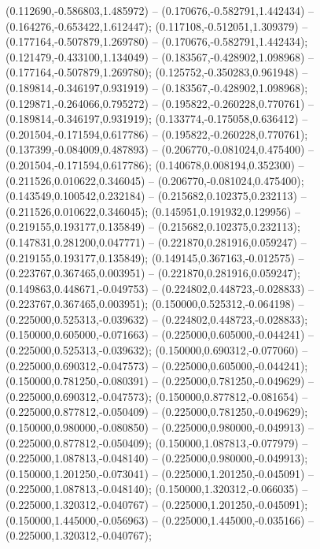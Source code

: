  (0.112690,-0.586803,1.485972) -- (0.170676,-0.582791,1.442434) -- (0.164276,-0.653422,1.612447);
 (0.117108,-0.512051,1.309379) -- (0.177164,-0.507879,1.269780) -- (0.170676,-0.582791,1.442434);
 (0.121479,-0.433100,1.134049) -- (0.183567,-0.428902,1.098968) -- (0.177164,-0.507879,1.269780);
 (0.125752,-0.350283,0.961948) -- (0.189814,-0.346197,0.931919) -- (0.183567,-0.428902,1.098968);
 (0.129871,-0.264066,0.795272) -- (0.195822,-0.260228,0.770761) -- (0.189814,-0.346197,0.931919);
 (0.133774,-0.175058,0.636412) -- (0.201504,-0.171594,0.617786) -- (0.195822,-0.260228,0.770761);
 (0.137399,-0.084009,0.487893) -- (0.206770,-0.081024,0.475400) -- (0.201504,-0.171594,0.617786);
 (0.140678,0.008194,0.352300) -- (0.211526,0.010622,0.346045) -- (0.206770,-0.081024,0.475400);
 (0.143549,0.100542,0.232184) -- (0.215682,0.102375,0.232113) -- (0.211526,0.010622,0.346045);
 (0.145951,0.191932,0.129956) -- (0.219155,0.193177,0.135849) -- (0.215682,0.102375,0.232113);
 (0.147831,0.281200,0.047771) -- (0.221870,0.281916,0.059247) -- (0.219155,0.193177,0.135849);
 (0.149145,0.367163,-0.012575) -- (0.223767,0.367465,0.003951) -- (0.221870,0.281916,0.059247);
 (0.149863,0.448671,-0.049753) -- (0.224802,0.448723,-0.028833) -- (0.223767,0.367465,0.003951);
 (0.150000,0.525312,-0.064198) -- (0.225000,0.525313,-0.039632) -- (0.224802,0.448723,-0.028833);
 (0.150000,0.605000,-0.071663) -- (0.225000,0.605000,-0.044241) -- (0.225000,0.525313,-0.039632);
 (0.150000,0.690312,-0.077060) -- (0.225000,0.690312,-0.047573) -- (0.225000,0.605000,-0.044241);
 (0.150000,0.781250,-0.080391) -- (0.225000,0.781250,-0.049629) -- (0.225000,0.690312,-0.047573);
 (0.150000,0.877812,-0.081654) -- (0.225000,0.877812,-0.050409) -- (0.225000,0.781250,-0.049629);
 (0.150000,0.980000,-0.080850) -- (0.225000,0.980000,-0.049913) -- (0.225000,0.877812,-0.050409);
 (0.150000,1.087813,-0.077979) -- (0.225000,1.087813,-0.048140) -- (0.225000,0.980000,-0.049913);
 (0.150000,1.201250,-0.073041) -- (0.225000,1.201250,-0.045091) -- (0.225000,1.087813,-0.048140);
 (0.150000,1.320312,-0.066035) -- (0.225000,1.320312,-0.040767) -- (0.225000,1.201250,-0.045091);
 (0.150000,1.445000,-0.056963) -- (0.225000,1.445000,-0.035166) -- (0.225000,1.320312,-0.040767);
